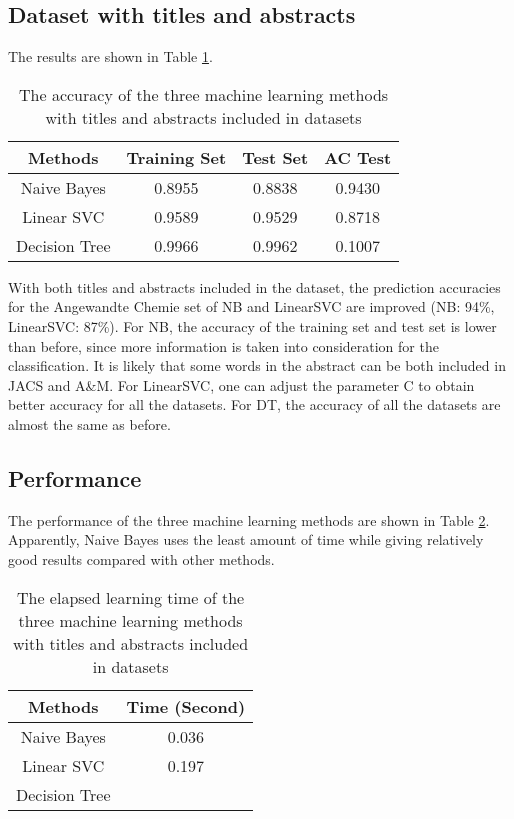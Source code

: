 \documentclass[conference]{IEEEtran}
\begin{document}
\subsection{Dataset with titles and abstracts}

The results are shown in Table \ref{tab:acc-abs}.

\begin{table}
    \caption{The accuracy of the three machine learning methods with titles and abstracts included in datasets\label{tab:acc-abs}}
    \begin{center}
        \begin{tabular}{c | c | c | c}
            \hline
            \bf{Methods} & \bf{Training Set} & \bf{Test Set} & \bf{AC Test} \\
            \hline
            Naive Bayes & 0.8955 & 0.8838 & 0.9430 \\
            \hline
            Linear SVC & 0.9589 & 0.9529 & 0.8718 \\
            \hline
            Decision Tree & 0.9966 & 0.9962 & 0.1007 \\
            \hline
        \end{tabular}
    \end{center}
\end{table}

With both titles and abstracts included in the dataset, the prediction accuracies for the Angewandte Chemie set of NB and LinearSVC are improved (NB: 94\%, LinearSVC: 87\%). For NB, the accuracy of the training set and test set is lower than before, since more information is taken into consideration for the classification. It is likely that some words in the abstract can be both included in JACS and A\&M. For LinearSVC, one can adjust the parameter C to obtain better accuracy for all the datasets. For DT, the accuracy of all the datasets are almost the same as before.

\subsection{Performance}
The performance of the three machine learning methods are shown in Table \ref{tab:performance}. Apparently, Naive Bayes uses the least amount of time while giving relatively good results compared with other methods.

\begin{table}
    \caption{The elapsed learning time of the three machine learning methods with titles and abstracts included in datasets\label{tab:performance}}
    \begin{center}
        \begin{tabular}{c | c }
            \hline
            \bf{Methods} & \bf{Time (Second)} \\
            \hline
            Naive Bayes &  0.036 \\
            \hline
            Linear SVC & 0.197 \\
            \hline
            Decision Tree &  \\
            \hline
        \end{tabular}
    \end{center}
\end{table}
\end{document}
